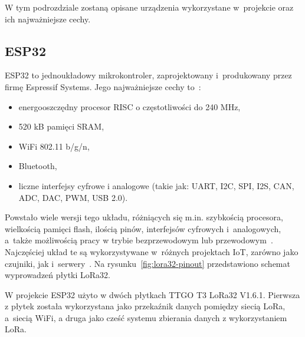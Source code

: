 W tym podrozdziale zostaną opisane urządzenia wykorzystane w~projekcie oraz ich najważniejsze cechy.

\subsection{ESP32}
ESP32 to jednoukładowy mikrokontroler, zaprojektowany i~produkowany przez firmę Espressif Systems.
Jego najważniejsze cechy to~\cite{ESP32:datasheet}:
\begin{itemize}
    \item energooszczędny procesor RISC o częstotliwości do 240 MHz,
    \item 520 kB pamięci SRAM,
    \item WiFi 802.11 b/g/n,
    \item Bluetooth,
    \item liczne interfejsy cyfrowe i analogowe (takie jak: UART, I2C, SPI, I2S, CAN, ADC, DAC, PWM, USB 2.0).
\end{itemize}

Powstało wiele wersji tego układu, różniących się m.in. szybkością procesora, wielkością pamięci flash, ilością pinów, interfejsów cyfrowych i~analogowych, a~także możliwością pracy w trybie bezprzewodowym lub przewodowym~\cite{ESP32:socs}.
Najczęściej układ te są wykorzystywane w~różnych projektach IoT, zarówno jako czujniki, jak i~serwery~\cite{ESP32:datasheet}. Na rysunku~\ref{fig:lora32-pinout} przedstawiono schemat wyprowadzeń płytki LoRa32.


W projekcie ESP32 użyto w dwóch płytkach TTGO T3 LoRa32 V1.6.1.
Pierwsza z płytek została wykorzystana jako przekaźnik danych pomiędzy siecią LoRa, a~siecią WiFi, a druga jako cześć systemu zbierania danych z wykorzystaniem LoRa.

